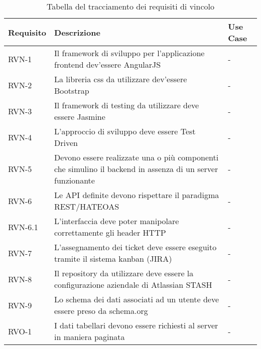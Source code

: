 \begin{table}%
\caption{Tabella del tracciamento dei requisiti di vincolo}
\label{tab:requisiti-vincolo}
\begin{tabularx}{\textwidth}{lXl}
\hline\hline
\textbf{Requisito} & \textbf{Descrizione} & \textbf{Use Case}\\
\hline
RVN-1 & Il framework di sviluppo per l'applicazione frontend dev'essere AngularJS & - \\
\hline
RVN-2 & La libreria css da utilizzare dev'essere Bootstrap & - \\
\hline
RVN-3 & Il framework di testing da utilizzare deve essere Jasmine & - \\
\hline
RVN-4 & L'approccio di sviluppo deve essere Test Driven & - \\
\hline
RVN-5 & Devono essere realizzate una o più componenti che simulino il backend in assenza di un server funzionante & - \\
\hline
RVN-6 & Le API definite devono rispettare il paradigma REST/HATEOAS & - \\
\hline
RVN-6.1 & L'interfaccia deve poter manipolare correttamente gli header HTTP & - \\
\hline
RVN-7 & L'assegnamento dei ticket deve essere eseguito tramite il sistema kanban (JIRA) & - \\
\hline
RVN-8 & Il repository da utilizzare deve essere la configurazione aziendale di Atlassian STASH & - \\
\hline
RVN-9 & Lo schema dei dati associati ad un utente deve essere preso da schema.org & - \\
\hline
RVO-1 & I dati tabellari devono essere richiesti al server in maniera paginata & - \\
\hline
\end{tabularx}
\end{table}%